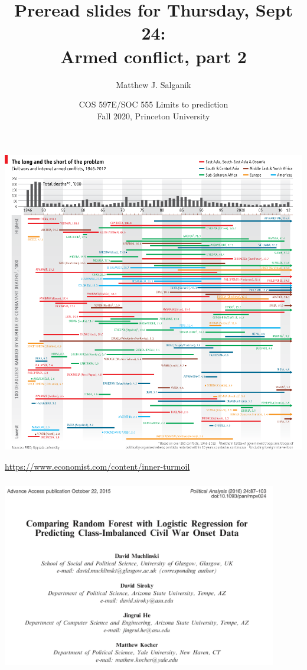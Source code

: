 \documentclass[aspectratio=169]{beamer}
\title[]{Preread slides for Thursday, Sept 24:\\Armed conflict, part 2}
\author[]{Matthew J. Salganik}
\institute[]{}
\date[]{COS 597E/SOC 555 Limits to prediction\\Fall 2020, Princeton University}
\begin{document}
\frame{\titlepage}
\begin{frame}
\frametitle{}

\begin{center}
\includegraphics[height=0.9\textheight]{figures/ourworldindata_the-100-deadlist-civil-wars-the-economist}
\end{center}

\vfill
\tiny{\url{https://www.economist.com/content/inner-turmoil}}
\end{frame}
\begin{frame}
\frametitle{}

\begin{center}
\includegraphics[width=0.9\textwidth]{figures/muchlinksi_comparing_2016_title}
\end{center}

\end{frame}
\end{document}
